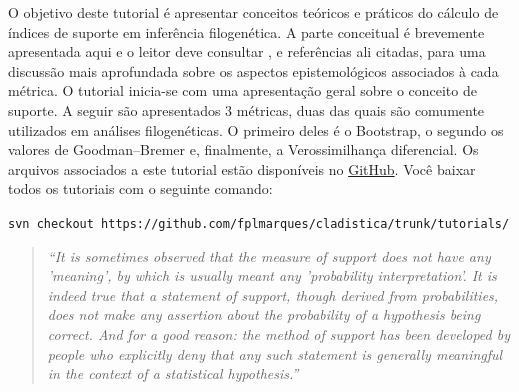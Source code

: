 \begin{refsection}
\renewcommand*{\finalnamedelim}{\addspace\&\space} %

O objetivo deste tutorial é apresentar conceitos teóricos e práticos do cálculo de índices de suporte em inferência filogenética. A parte conceitual é brevemente apresentada aqui e o leitor deve consultar \textcite{GrantKluge2008b}, e referências ali citadas, para uma discussão mais aprofundada sobre os aspectos epistemológicos associados à cada métrica. O tutorial inicia-se com uma apresentação geral sobre o conceito de suporte. A seguir são apresentados 3 métricas, duas das quais são comumente utilizados em análises filogenéticas. O primeiro deles é o Bootstrap, o segundo os valores de Goodman--Bremer e, finalmente, a Verossimilhança diferencial. Os arquivos associados a este tutorial estão disponíveis no \href{https://github.com/fplmarques/cladistica/tree/main/tutorials/}{GitHub}. Você baixar todos os tutoriais com o seguinte comando:

\begin{center}
\small \texttt{svn checkout https://github.com/fplmarques/cladistica/trunk/tutorials/}\\
\end{center}


\newpage
\pagestyle{fancy} %
\newcommand{\A}{\textcolor{green}{\textbf{A}}}
\newcommand{\C}{\textcolor{blue}{\textbf{C}}}
\newcommand{\G}{\textcolor{gray}{\textbf{G}}}
\newcommand{\T}{\textcolor{red}{\textbf{T}}}
\newcommand{\gap}{\textcolor{black}{\textbf{-}}}





\begin{quote}
\scriptsize\textit{``It is sometimes observed that the measure of support does not have any 'meaning', by which is usually meant any 'probability interpretation'. It is indeed true that a statement of support, though derived from probabilities, does not make any assertion about the probability of a hypothesis being correct. And for a good reason: the method of support has been developed by people who explicitly deny that any such statement is generally meaningful in the context of a statistical hypothesis.''} \parencite[][:33]{Edwards_1992}
\end{quote}


\end{refsection}
